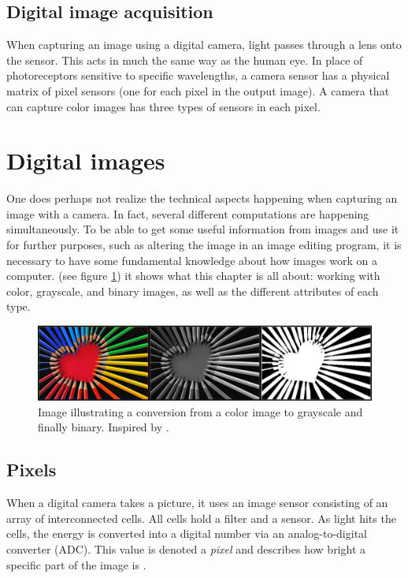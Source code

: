 \subsection{Digital image acquisition}
When capturing an image using a digital camera, light passes through a lens onto the sensor. This acts in much the same way as the human eye. In place of photoreceptors sensitive to specific wavelengths, a camera sensor has a physical matrix of pixel sensors (one for each pixel in the output image). A camera that can capture color images has three types of sensors in each pixel\citep{ip_book}.

\section{Digital images}
One does perhaps not realize the technical aspects happening when capturing an image with a camera. In fact, several different computations are happening simultaneously. To be able to get some useful information from images and use it for further purposes, such as altering the image in an image editing program, it is necessary to have some fundamental knowledge about how images work on a computer. (see figure \ref{fig:ip_ColoredToGrayscaleToBinary}) it shows what this chapter is all about: working with color, grayscale, and binary images, as well as the different attributes of each type.

\begin{figure}[htbp]
\centering
\includegraphics[width=1.00\textwidth]{Pictures/Theory/ColoredToGrayscaleToBinary.jpg}
\caption{Image illustrating a conversion from a color image to grayscale and finally binary. Inspired by \citep{colorPencils}.}
\label{fig:ip_ColoredToGrayscaleToBinary}
\end{figure}

\subsection{Pixels}
When a digital camera takes a picture, it uses an image sensor consisting of an array of interconnected cells. All cells hold a filter and a sensor. As light hits the cells, the energy is converted into a digital number via an analog-to-digital converter (ADC). This value is denoted a \textit{pixel} and describes how bright a specific part of the image is \citep{ip_book}.

